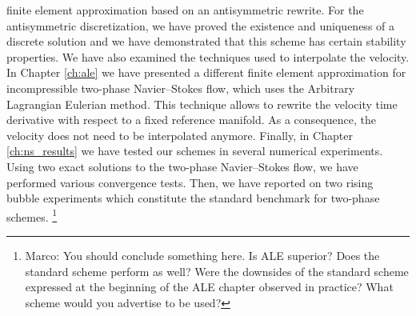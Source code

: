 finite element approximation based on an antisymmetric rewrite. For the
antisymmetric discretization, we have proved the existence and uniqueness of a
discrete solution and we have demonstrated that this scheme has certain
stability properties. We have also examined the techniques used to interpolate
the velocity. In Chapter \ref{ch:ale} we have presented a different finite
element approximation for incompressible two-phase Navier--Stokes flow, which
uses the Arbitrary Lagrangian Eulerian method. This technique allows to
rewrite the velocity time derivative with respect to a fixed reference
manifold. As a consequence, the velocity does not need to be interpolated
anymore. Finally, in Chapter \ref{ch:ns_results} we have tested our schemes in
several numerical experiments. Using two exact solutions to the two-phase
Navier--Stokes flow, we have performed various convergence tests. Then, we have
reported on two rising bubble experiments which constitute the standard
benchmark for two-phase schemes.
\footnote{Marco: You should conclude something here. Is ALE superior? Does the
standard scheme perform as well? Were the downsides of the standard scheme
expressed at the beginning of the ALE chapter observed in practice? What scheme
would you advertise to be used?}
